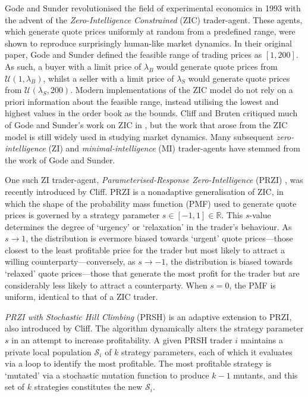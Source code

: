 \documentclass[a4paper,twoside]{article}
\begin{document}
Gode and Sunder \cite{GodeSunder} revolutionised the field of experimental economics in 1993 with the advent of the \textit{Zero-Intelligence Constrained} (ZIC) trader-agent.
These agents, which generate quote prices uniformly at random from a predefined range, were shown to reproduce surprisingly human-like market dynamics.
In their original paper, Gode and Sunder defined the feasible range of trading prices as $[1,  200]$.
As such, a buyer with a limit price of $\lambda_B$ would generate quote prices from $\mathcal{U}(1, \lambda_B)$, whilst a seller with a limit price of $\lambda_S$ would generate quote prices from $\mathcal{U}(\lambda_S, 200)$.
Modern implementations of the ZIC model do not rely on a priori information about the feasible range, instead utilising the lowest and highest values in the order book as the bounds.
Cliff and Bruten critiqued much of Gode and Sunder's work on ZIC in \cite{ZIP}, but the work that arose from the ZIC model is still widely used in studying market dynamics.
Many subsequent \textit{zero-intelligence} (ZI) and \textit{minimal-intelligence} (MI) trader-agents have stemmed from the work of Gode and Sunder.

One such ZI trader-agent, \textit{Parameterised-Response Zero-Intelligence} (PRZI) \cite{PRZI}, was recently introduced by Cliff.
PRZI is a nonadaptive generalisation of ZIC, in which the shape of the probability mass function (PMF) used to generate quote prices is governed by a strategy parameter $s\in[-1, 1]\in\mathbb{R}$.
This $s$-value determines the degree of `urgency' or `relaxation' in the trader's behaviour.
As $s\to1$, the distribution is evermore biased towards `urgent' quote prices---those closest to the least profitable price for the trader but most likely to attract a willing counterparty---conversely, as $s\to-1$, the distribution is biased towards `relaxed' quote prices---those that generate the most profit for the trader but are considerably less likely to attract a counterparty.
When $s=0$, the PMF is uniform, identical to that of a ZIC trader.

\textit{PRZI with Stochastic Hill Climbing} (PRSH) \cite{PRSH} is an adaptive extension to PRZI, also introduced by Cliff.
The algorithm dynamically alters the strategy parameter $s$ in an attempt to increase profitability.
A given PRSH trader $i$ maintains a private local population $\mathcal{S}_i$ of $k$ strategy parameters, each of which it evaluates via a loop to identify the most profitable.
The most profitable strategy is `mutated' via a stochastic mutation function to produce $k-1$ mutants, and this set of $k$ strategies constitutes the new $\mathcal{S}_i$.
\end{document}
